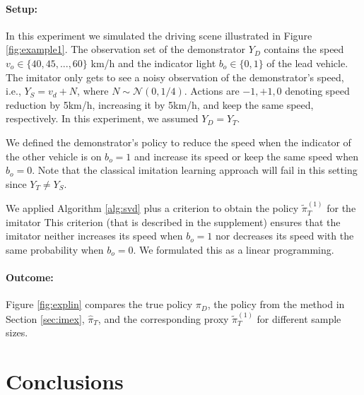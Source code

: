 \documentclass[letterpaper]{article} %
\theoremstyle{definition}%
\theoremstyle{definition}
\newcommand{\Obs}{Y}
\newcommand{\todo}[1]{\textcolor{red}{#1}}
\begin{document}
\paragraph{Setup:}
In this experiment we simulated the driving scene illustrated in Figure \ref{fig:example1}. The observation set of the demonstrator $\Obs_D$ contains the speed $v_o\in\{40, 45, ...,60\}$ km/h and the indicator light $b_o\in\{0,1\}$ of the lead vehicle. The imitator only gets to see a noisy observation of the demonstrator's speed, i.e., $\Obs_S= v_d + N$, where $N\sim\mathcal{N}(0,1/4)$.  Actions are $-1, +1, 0$ denoting speed reduction by 5km/h, increasing it by 5km/h, and keep the same speed, respectively. In this experiment, we assumed $\Obs_D=\Obs_T$.

We defined the demonstrator's policy to reduce the speed when the indicator of the other vehicle is on $b_o=1$ and increase its speed or keep the same speed when $b_o=0$. 
Note that the classical imitation learning approach will fail in this setting since $\Obs_T\neq\Obs_S$.

We applied Algorithm \ref{alg:svd} plus a criterion to obtain the policy $\tilde{\pi}_T^{(1)}$ for the imitator
This criterion (that is described in the supplement) ensures that the imitator neither increases its speed when $b_o=1$ nor decreases its speed with the same probability when $b_o=0$. We formulated this as a linear programming. 

\paragraph{Outcome:} 
 
Figure \ref{fig:explin} compares the true policy $\pi_D$, the policy from the method in Section \ref{sec:imex}, $\hat{\pi}_T$, and the corresponding proxy $\tilde{\pi}^{(1)}_T$ for different sample sizes.




\section{Conclusions}
\end{document}
